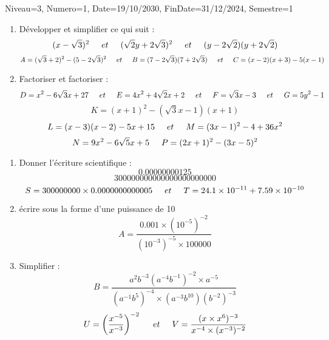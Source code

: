\documentclass[a4paper,12pt]{article}
\begin{document}
\begin{Maquette}[DM]{Niveau=3, Numero=1, Date=19/10/2030, FinDate=31/12/2024, Semestre=1}

\begin{exercice}
\begin{enumerate}
\item Développer et simplifier ce qui suit : 
\[ (x-\sqrt{3})^{2}\hspace*{0.5cm}et\hspace*{0.5cm}
	(\sqrt{2}y+2\sqrt{3})^{2}\hspace*{0.5cm}et\hspace*{0.5cm}
		(y-2\sqrt{2})(y+2\sqrt{2})\]
\[
A=(\sqrt{3}+2)^{2}-(5-2\sqrt{3})^{2}\hspace*{0.5 cm}et\hspace*{0.5 cm}
B=(7-2\sqrt{3})(7+2\sqrt{3})\hspace*{0.5 cm}et\hspace*{0.5 cm}
C=(x-2)(x+3)-5(x-1)
\]		
\item Factoriser et factoriser :
\[ D=x^{2}-6\sqrt{3}x+27\hspace*{0.5cm}et\hspace*{0.5cm}
	E=4x^{2}+4\sqrt{2}x+2\hspace*{0.5cm}et\hspace*{0.5cm}
		F=\sqrt{3}x-3\hspace*{0.5cm}et\hspace*{0.5cm}
		G=5y^{2}-1\]
	\[K=(x+1)^{2}-(\sqrt{3}x-1)(x+1)\]
	\[
L=(x-3)(x-2)-5x+15\hspace*{0.5 cm}et\hspace*{0.5 cm}
M=(3x-1)^{2}-4+36x^{2}\]
\[N=9x^{2}-6\sqrt{5}x+5\hspace*{0.5 cm}
P=(2x+1)^{2}-(3x-5)^{2}
\]
\end{enumerate}
\end{exercice}

\begin{exercice}
\begin{enumerate}

\item Donner l'écriture scientifique :
\[0.00000000125 \]
\[300000000000000000000000 \]
\[
S=300000000 \times 0.0000000000005 \hspace*{0.5cm}et\hspace*{0.5cm}
T=24.1 \times 10^{-11}+ 7.59 \times 10^{-10}
\]
\item écrire sous la forme d'une puissance de 10
\[ A=\dfrac{0.001 \times (10^{-5})^{-2}}{(10^{-3})^{-5}\times 100000}\]
\item Simplifier :
\[ B=\dfrac{a^{2}b^{-3}(a^{-4}b^{-1})^{-2}\times a^{-5}}{(a^{-1}b^{5})^{-4}\times (a^{-3}b^{10})(b^{-2})^{-3}} \]
\[
U=\left( \dfrac{x^{-5}}{x^{-3}}\right)^{-2} \hspace*{0.5cm}et\hspace*{0.5cm}
V=\dfrac{(x \times x^{6})^{-3}}{x^{-4}\times (x^{-3})^{-2}}
\]
\end{enumerate}
\end{exercice}


\end{Maquette}
\end{document}
